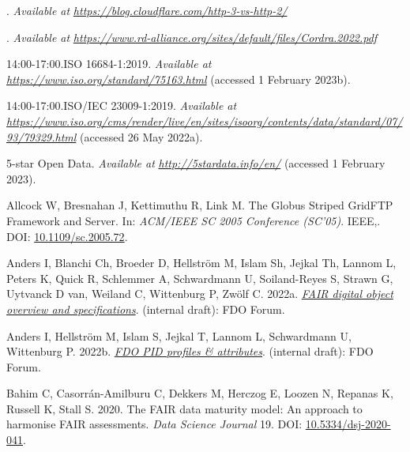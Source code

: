 \hypertarget{refs}{}
\begin{CSLReferences}{1}{0}
\leavevmode{}%
. \emph{Available at} \href{https://blog.cloudflare.com/http-3-vs-http-2/}{\emph{https://blog.cloudflare.com/http-3-vs-http-2/}}

\leavevmode{}%
. \emph{Available at} \href{https://www.rd-alliance.org/sites/default/files/Cordra.2022.pdf}{\emph{https://www.rd-alliance.org/sites/default/files/Cordra.2022.pdf}}

\leavevmode{}%
14:00-17:00.ISO 16684-1:2019. \emph{Available at} \href{https://www.iso.org/standard/75163.html}{\emph{https://www.iso.org/standard/75163.html}} (accessed 1 February 2023b).

\leavevmode{}%
14:00-17:00.ISO/IEC 23009-1:2019. \emph{Available at} \href{https://www.iso.org/cms/render/live/en/sites/isoorg/contents/data/standard/07/93/79329.html}{\emph{https://www.iso.org/cms/render/live/en/sites/isoorg/contents/data/standard/07/93/79329.html}} (accessed 26 May 2022a).

\leavevmode{}%
5-star Open Data. \emph{Available at} \href{http://5stardata.info/en/}{\emph{http://5stardata.info/en/}} (accessed 1 February 2023).

\leavevmode{}%
Allcock W, Bresnahan J, Kettimuthu R, Link M. The Globus Striped GridFTP Framework and Server. In: \emph{ACM/IEEE SC 2005 Conference (SC'05)}. IEEE,. DOI: \href{https://doi.org/10.1109/sc.2005.72}{10.1109/sc.2005.72}.

\leavevmode{}%
Anders I, Blanchi Ch, Broeder D, Hellström M, Islam Sh, Jejkal Th, Lannom L, Peters K, Quick R, Schlemmer A, Schwardmann U, Soiland-Reyes S, Strawn G, Uytvanck D van, Weiland C, Wittenburg P, Zwölf C. 2022a. \emph{\href{https://docs.google.com/document/d/1GAj-1owAAPDF7hVis2dYPPCOHiPHrIXIo4j-S5AdEFI/edit}{FAIR digital object overview and specifications}}. (internal draft): FDO Forum.

\leavevmode{}%
Anders I, Hellström M, Islam S, Jejkal T, Lannom L, Schwardmann U, Wittenburg P. 2022b. \emph{\href{https://docs.google.com/document/d/1c2mZziq5pIPmLxMHLcYqlWrjYsc2ezGMXvp0E46iljo/edit}{FDO PID profiles \& attributes}}. (internal draft): FDO Forum.

\leavevmode{}%
Bahim C, Casorrán-Amilburu C, Dekkers M, Herczog E, Loozen N, Repanas K, Russell K, Stall S. 2020. The FAIR data maturity model: An approach to harmonise FAIR assessments. \emph{Data Science Journal} 19. DOI: \href{https://doi.org/10.5334/dsj-2020-041}{10.5334/dsj-2020-041}.


\end{CSLReferences}

